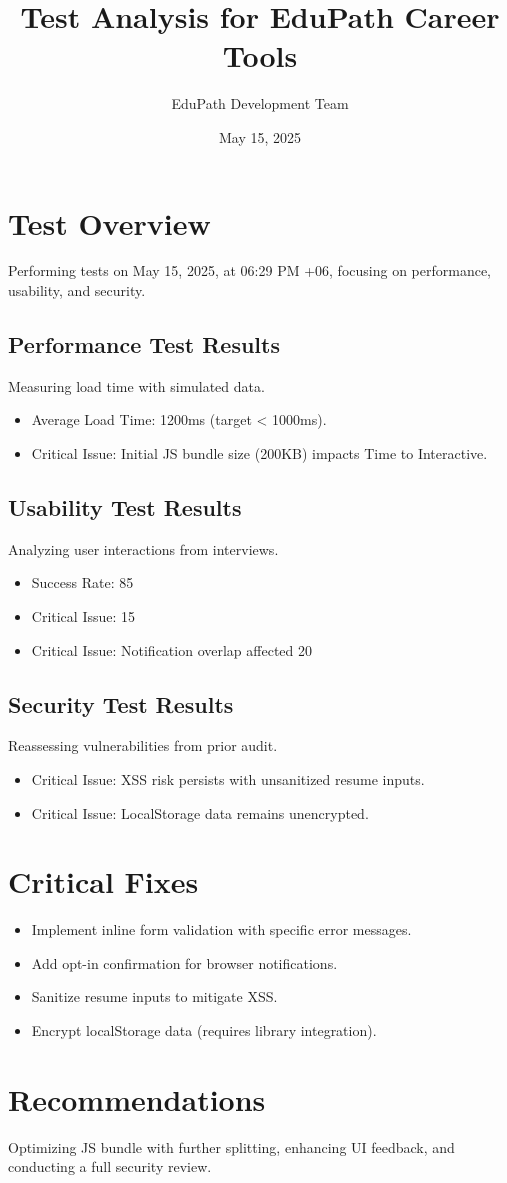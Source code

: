 \documentclass[a4paper,12pt]{article}
\title{Test Analysis for EduPath Career Tools}
\author{EduPath Development Team}
\date{May 15, 2025}
\begin{document}
\maketitle

\section*{Test Overview}
Performing tests on May 15, 2025, at 06:29 PM +06, focusing on performance, usability, and security.

\subsection{Performance Test Results}
Measuring load time with simulated data.
\begin{itemize}
  \item Average Load Time: 1200ms (target < 1000ms).
  \item Critical Issue: Initial JS bundle size (200KB) impacts Time to Interactive.
\end{itemize}

\subsection{Usability Test Results}
Analyzing user interactions from interviews.
\begin{itemize}
  \item Success Rate: 85%
  \item Critical Issue: 15%
  \item Critical Issue: Notification overlap affected 20%
\end{itemize}

\subsection{Security Test Results}
Reassessing vulnerabilities from prior audit.
\begin{itemize}
  \item Critical Issue: XSS risk persists with unsanitized resume inputs.
  \item Critical Issue: LocalStorage data remains unencrypted.
\end{itemize}

\section{Critical Fixes}
\begin{itemize}
  \item Implement inline form validation with specific error messages.
  \item Add opt-in confirmation for browser notifications.
  \item Sanitize resume inputs to mitigate XSS.
  \item Encrypt localStorage data (requires library integration).
\end{itemize}

\section{Recommendations}
Optimizing JS bundle with further splitting, enhancing UI feedback, and conducting a full security review.
\end{document}
